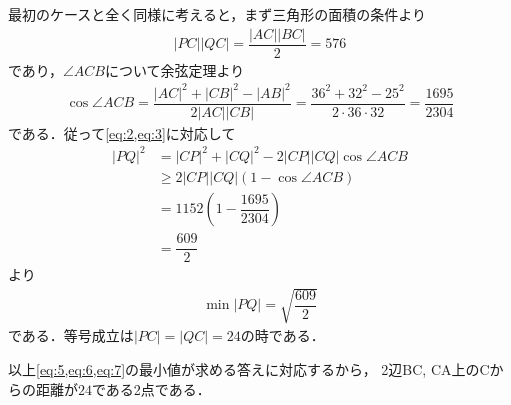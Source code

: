 \documentclass[../../main.tex]{subfiles}
\begin{document}
最初のケースと全く同様に考えると，まず三角形の面積の条件より
\begin{align}
  |PC||QC| = \dfrac{|AC||BC|}{2} = 576
\end{align}
であり，$\angle ACB$について余弦定理より
\begin{align}
  \cos \angle ACB = \dfrac{|AC|^2+|CB|^2-|AB|^2}{2|AC||CB|} = \dfrac{36^2+32^2-25^2}{2\cdot 36\cdot 32} = \dfrac{1695}{2304}
\end{align}
である．従って\cref{eq:2,eq:3}に対応して
\begin{align}
  |PQ|^2
  &= |CP|^2 + |CQ|^2 - 2 |CP||CQ| \cos \angle ACB \\
  &\ge 2|CP||CQ| \left(1-\cos \angle ACB\right) \\
  &= 1152\left(1-\dfrac{1695}{2304}\right) \\
  &= \dfrac{609}{2}
\end{align}
より
\begin{align}
  \min |PQ| = \sqrt{\dfrac{609}{2}} \label{eq:7}
\end{align}
である．等号成立は$|PC|=|QC|=24$の時である．
\casesend

以上\cref{eq:5,eq:6,eq:7}の最小値が求める答えに対応するから，
2辺BC, CA上のCからの距離が$24$である2点である．
\end{document}
